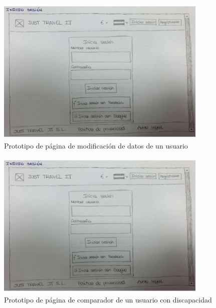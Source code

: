 \begin{figure}[H]
    \centering
    \includegraphics[page=14, width=0.9\textwidth]{./Imagenes/Prototipo/Prototipos definitivos - Iteracion I.pdf}
    \caption{Prototipo de página de modificación de datos de un usuario}
    \label{fig:prot_usuario_mod}
\end{figure}

\begin{figure}[H]
    \centering
    \includegraphics[page=5, width=0.9\textwidth]{./Imagenes/Prototipo/Prototipos definitivos - Iteracion I.pdf}
    \caption{Prototipo de página de comparador de un usuario con discapacidad}
    \label{fig:prot_comp_dis}
\end{figure}

